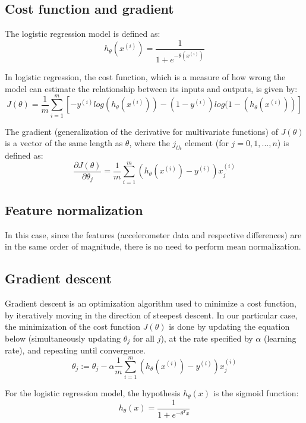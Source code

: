 \documentclass[conference]{IEEEtran}
\begin{document}
\subsection{Cost function and gradient}
The logistic regression model is defined as: 
\begin{equation}
    h_{\theta}(x^{(i)})=  \frac{1}{1+e^{-\theta (x^{(i)})}}
    \label{eq2}
\end{equation}
\par In logistic regression, the cost function, which is a measure of how wrong the model can estimate the relationship between its inputs and outputs, is given by:
\begin{equation}
    J(\theta) = \frac{1}{m} \sum_{i=1}^{m} [ -y^{(i)}log(h_{\theta}(x^{(i)})) - (1 - y^{(i)})log(1 - (h_{\theta}(x^{(i)}))]
    \label{eq3}
\end{equation}
\par The gradient (generalization of the derivative for multivariate functions) of $J(\theta)$ is a vector of the same length as $\theta$,  where the $j_{th}$ element (for $j = 0, 1, ..., n$) is defined as:
\begin{equation}
    \frac{\partial J(\theta)}{\partial \theta_j} = \frac{1}{m} \sum_{i=1}^{m} (h_{\theta}(x^{(i)}) - y^{(i)})x_j^{(i)}
    \label{eq4}
\end{equation}

\subsection{Feature normalization}
In this case, since the features (accelerometer data and respective differences) are in the same order of magnitude, there is no need to perform mean normalization.

\subsection{Gradient descent}
Gradient descent is an optimization algorithm used to minimize a cost function, by iteratively moving in the direction of steepest descent. In our particular case, the minimization of the cost function $J(\theta)$ is done by updating the equation below (simultaneously updating $\theta_j$ for all $j$), at the rate specified by $\alpha$ (learning rate), and repeating until convergence.    
\begin{equation}
    \theta_j := \theta_j - \alpha \frac{1}{m} \sum_{i=1}^m (h_{\theta}(x^{(i)}) - y^{(i)})x_j^{(i)}
    \label{eq5}
\end{equation}
\par For the logistic regression model, the hypothesis $h_{\theta}(x)$ is the sigmoid function:
\begin{equation}
    h_{\theta}(x)= \frac{1}{1+e^{-\theta^T x}}
    \label{eq6}
\end{equation}
\end{document}

